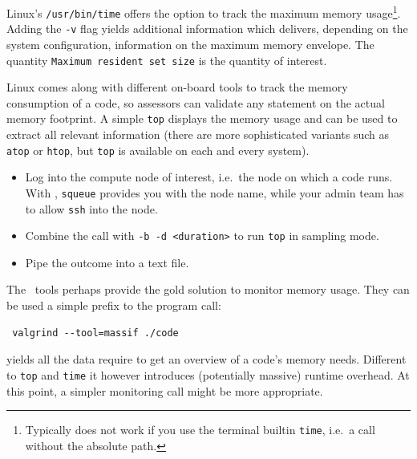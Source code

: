 \begin{instructions}{\linux}
 Linux's \texttt{/usr/bin/time} offers the option to track the maximum memory usage\footnote{Typically does not work if you use the terminal builtin \texttt{time}, i.e.~a call without the absolute path.}.
 Adding the \texttt{-v} flag yields additional information which delivers, depending on the system configuration, information on the maximum memory envelope.
 The quantity \texttt{Maximum resident set size} is the quantity of interest.
\end{instructions}


\begin{instructions}{\linux}
 Linux comes along with different on-board tools to track the memory consumption of a code, so assessors can validate any statement on the actual memory footprint.
 A simple \texttt{top} displays the memory usage and can be used to extract all relevant information (there are more sophisticated variants such as \texttt{atop} or \texttt{htop}, but \texttt{top} is available on each and every system).
 \begin{itemize}
   \item Log into the compute node of interest, i.e.~the node on which a code runs. With \slurm, \texttt{squeue} provides you with the node name, while your admin team has to allow \texttt{ssh} into the node.
   \item Combine the call with \texttt{-b -d <duration>} to run \texttt{top} in sampling mode.
   \item Pipe the outcome into a text file.
 \end{itemize}
\end{instructions}


\begin{instructions}{\valgrind}
 The \valgrind~tools perhaps provide the gold solution to monitor memory usage.
 They can be used a simple prefix to the program call:
 \begin{verbatim}
 valgrind --tool=massif ./code
 \end{verbatim}
 
 \noindent
 yields all the data require to get an overview of a code's memory needs.
 Different to \texttt{top} and \texttt{time} it however introduces (potentially massive) runtime overhead.
 At this point, a simpler monitoring call might be more appropriate.
\end{instructions}


